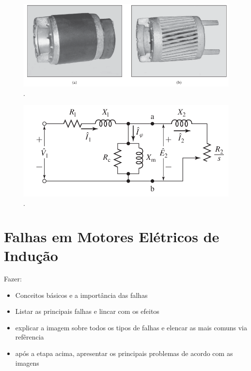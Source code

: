 \begin{figure}[H]
    \caption{.}
    \begin{center}
        \includegraphics[scale=.5]{referencial/img/rotor_fitzgerald_p345.png}
    \end{center}
    \label{fig:}
\end{figure}


\begin{figure}[H]
    \caption{.}
    \begin{center}
        \includegraphics[scale=.35]{referencial/img/circuit_fitzgerald_p354.png}
    \end{center}
    \label{fig:}
\end{figure}

% 

\section{Falhas em Motores Elétricos de Indução}\label{sec:}

Fazer:
\begin{itemize}
    \item Conceitos básicos e a importância das falhas
    \item Listar as principais falhas e lincar com os efeitos
    \item explicar a imagem sobre todos os tipos de falhas e elencar as mais comuns via refêrencia
    \item após a etapa acima, apresentar os principais problemas de acordo com as imagens
\end{itemize}

